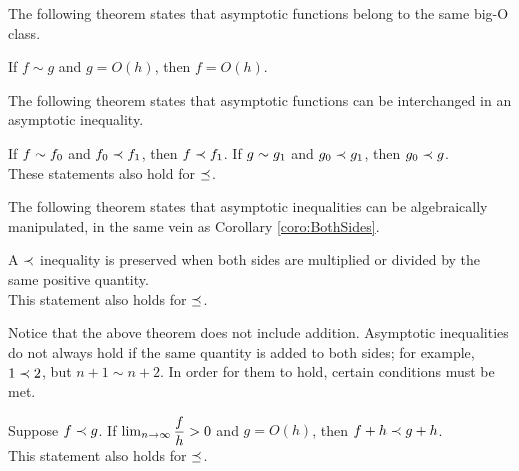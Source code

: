 The following theorem states that asymptotic functions belong to the same big-O class.

\begin{theorem}
\label{thm:SameBigOClass}
	If $f \sim g$ and $g = O(h)$, then $f = O(h)$.
\end{theorem}

The following theorem states that asymptotic functions can be interchanged in an asymptotic inequality.

\begin{theorem}
\label{thm:InterchangeableInInequality}
	If $f \sim f_0$ and $f_0 \prec f_1$, then $f \prec f_1$. If $g \sim g_1$ and $g_0 \prec g_1$, then $g_0 \prec g$.\\
	These statements also hold for $\preceq$.
\end{theorem}

The following theorem states that asymptotic inequalities can be algebraically manipulated, in the same vein as Corollary \ref{coro:BothSides}.

\begin{theorem}
\label{thm:BothSidesInequality}
	A $\prec$ inequality is preserved when both sides are multiplied or divided by the same positive quantity.\\
	This statement also holds for $\preceq$.
\end{theorem}

Notice that the above theorem does not include addition. Asymptotic inequalities do not always hold if the same quantity is added to both sides; for example, $1 \prec 2$, but $n + 1 \sim n + 2$. In order for them to hold, certain conditions must be met.

\begin{theorem}
\label{thm:BothSidesInequalityAdd}
	Suppose $f \prec g$. If $\lim_{n \to \infty} \dfrac{f}{h} > 0$ and $g = O(h)$, then $f + h \prec g + h$.\\
	This statement also holds for $\preceq$.
\end{theorem}